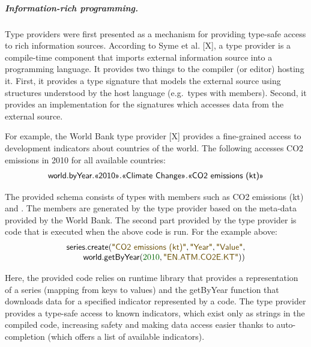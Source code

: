 \documentclass[a4paper,UKenglish]{lipics-v2016}
\newcommand{\num}[1]{\textcolor{numclr}{#1}}
\newcommand{\str}[1]{\textnormal{\textcolor{strclr}{\sffamily "#1"}}}
\newcommand{\ident}[1]{\textnormal{\sffamily #1}}
\newcommand{\qident}[1]{\textnormal{\sffamily \guillemotleft #1\guillemotright}}
\begin{document}
\subparagraph{Information-rich programming.} Type providers were first presented as a mechanism
for providing type-safe access to rich information sources. According to Syme et al. [X],
a type provider is a compile-time component that imports external information source into a
programming language. It provides two things to the compiler (or editor) hosting it. First, it 
provides a type signature that models the external source using structures understood by the
host language (e.g.~types with members). Second, it provides an implementation for the signatures
which accesses data from the external source.

For example, the World Bank type provider [X] provides a fine-grained access to development 
indicators about countries of the world. The following accesses CO2 emissions in 2010 for all 
available countries:
%
\begin{equation*}
\begin{array}{l}
\ident{world}.\ident{byYear}.\qident{2010}.\qident{Climate Change}.\qident{CO2 emissions (kt)}
\end{array}
\end{equation*}

\noindent
The provided schema consists of types with members such as \qident{CO2 emissions (kt)} and \qident{2010}.
The members are generated by the type provider based on the meta-data provided by the World Bank.
The second part provided by the type provider is code that is executed when the above code is run.
For the example above:
%
\begin{equation*}
\begin{array}{l}
\ident{series.create}(\str{CO2 emissions (kt)},\str{Year},\str{Value},\\
\qquad \ident{world.getByYear}(\num{2010},\str{EN.ATM.CO2E.KT}))
\end{array}
\end{equation*}

\noindent
Here, the provided code relies on runtime library that provides a representation of a series 
(mapping from keys to values) and the \ident{getByYear} function that downloads data for a specified
indicator represented by a code. The type provider provides a type-safe access to known indicators,
which exist only as strings in the compiled code, increasing safety and making data access easier
thanks to auto-completion (which offers a list of available indicators).
\end{document}

